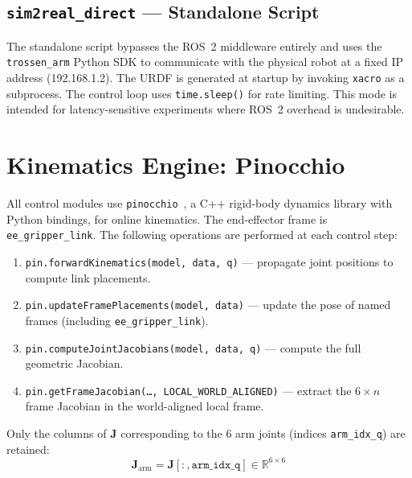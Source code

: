 \documentclass[12pt, a4paper]{article}
\begin{document}
\subsection{\texttt{sim2real\_direct} — Standalone Script}
\label{ssec:sim2real_direct}

The standalone script bypasses the ROS~2 middleware entirely and uses the
\texttt{trossen\_arm} Python SDK to communicate with the physical robot at a fixed IP
address (192.168.1.2). The URDF is generated at startup by invoking \texttt{xacro}
as a subprocess. The control loop uses \texttt{time.sleep()} for rate limiting.
This mode is intended for latency-sensitive experiments where ROS~2 overhead is
undesirable.

\section{Kinematics Engine: Pinocchio}
\label{sec:pinocchio}

All control modules use \texttt{pinocchio}~\cite{carpentier2019pinocchio},
a C++ rigid-body dynamics library with Python bindings, for online kinematics.
The end-effector frame is \texttt{ee\_gripper\_link}. The following operations
are performed at each control step:

\begin{enumerate}
  \item \texttt{pin.forwardKinematics(model, data, q)} — propagate joint positions
        to compute link placements.
  \item \texttt{pin.updateFramePlacements(model, data)} — update the pose of
        named frames (including \texttt{ee\_gripper\_link}).
  \item \texttt{pin.computeJointJacobians(model, data, q)} — compute the
        full geometric Jacobian.
  \item \texttt{pin.getFrameJacobian(\ldots, LOCAL\_WORLD\_ALIGNED)} — extract
        the $6 \times n$ frame Jacobian in the world-aligned local frame.
\end{enumerate}

Only the columns of $\mathbf{J}$ corresponding to the 6 arm joints (indices
\texttt{arm\_idx\_q}) are retained:
\begin{equation}
  \mathbf{J}_{\text{arm}} = \mathbf{J}[:, \texttt{arm\_idx\_q}] \in \mathbb{R}^{6 \times 6}
\end{equation}

\end{document}
